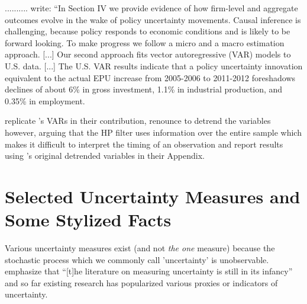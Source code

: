 \documentclass[a4paper,11pt,listof=nochaptergap,oneside,pointednumbers,bibtotoc,bigheadings,liststotoc]{scrbook}
\theoremstyle{mysatz}
\theoremstyle{mydefinition}
\theoremstyle{mytheorem}
\theoremstyle{mybemerkung}
\begin{document}
\citet{bakeretal:15} ..........
\citet[p. 1595]{bakeretal:15} write: ``In Section IV we provide evidence of how firm-level and aggregate outcomes evolve in the wake of policy uncertainty movements. Causal inference is challenging, because policy responds to economic conditions and is likely to be forward looking. To make progress we follow a micro and a macro estimation approach. [...] Our second approach fits vector autoregressive (VAR) models to U.S. data. [...] The U.S. VAR results indicate that a policy uncertainty innovation equivalent to the actual EPU increase from 2005-2006 to 2011-2012 foreshadows declines of about 6\% in gross investment, 1.1\% in industrial production, and 0.35\% in employment. 


\citet{juradoetal:15} replicate \citet{bloom:09}'s VARs in their contribution, renounce to detrend the variables however, arguing that the HP filter uses information over the entire sample which makes it difficult to interpret the timing of an observation and report results using \citet{bloom:09}'s original detrended variables in their Appendix.

\section{Selected Uncertainty Measures and Some Stylized Facts}
\label{sec:uncertaintymeasuresandstylizedfacts}


Various uncertainty measures exist (and not \textit{the one} measure) because the stochastic process which we commonly call 'uncertainty' is unobservable. \citet[p. 1182]{juradoetal:15} emphasize that ``[t]he literature on measuring uncertainty is still in its infancy'' and so far existing research has popularized various proxies or indicators of uncertainty.
\end{document}
